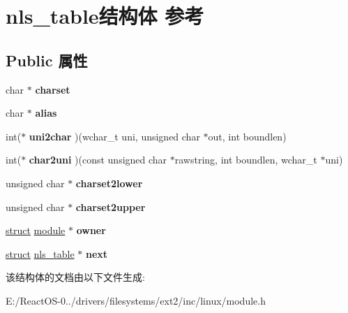 \hypertarget{structnls__table}{}\section{nls\+\_\+table结构体 参考}
\label{structnls__table}
\subsection*{Public 属性}
\begin{DoxyCompactItemize}
\item 
\mbox{\label{structnls__table_aa32d24f9f1735b25fd8eac1dc2600035}} 
char $\ast$ {\bfseries charset}
\item 
\mbox{\label{structnls__table_a467d3567ae03f7618fae3b631f2cb3ad}} 
char $\ast$ {\bfseries alias}
\item 
\mbox{\label{structnls__table_ae02714385f99c96d254115e4bdb1c037}} 
int($\ast$ {\bfseries uni2char} )(wchar\+\_\+t uni, unsigned char $\ast$out, int boundlen)
\item 
\mbox{\label{structnls__table_a89dc34cbff39fff9b645ad45f34fe7c2}} 
int($\ast$ {\bfseries char2uni} )(const unsigned char $\ast$rawstring, int boundlen, wchar\+\_\+t $\ast$uni)
\item 
\mbox{\label{structnls__table_a50e2e873c75d3598faa298bb63e9c1e6}} 
unsigned char $\ast$ {\bfseries charset2lower}
\item 
\mbox{\label{structnls__table_a5b6f8e4f83dc02b81636236d1c293de9}} 
unsigned char $\ast$ {\bfseries charset2upper}
\item 
\mbox{\label{structnls__table_a1cda249a607d509ff39cd50cf7053dba}} 
\hyperlink{interfacestruct}{struct} \hyperlink{structmodule}{module} $\ast$ {\bfseries owner}
\item 
\mbox{\label{structnls__table_aeacb042f6edb9d51b952786f7f370ea7}} 
\hyperlink{interfacestruct}{struct} \hyperlink{structnls__table}{nls\+\_\+table} $\ast$ {\bfseries next}
\end{DoxyCompactItemize}


该结构体的文档由以下文件生成\+:\begin{DoxyCompactItemize}
\item 
E\+:/\+React\+O\+S-\/0../drivers/filesystems/ext2/inc/linux/module.\+h\end{DoxyCompactItemize}
